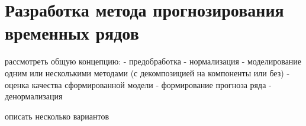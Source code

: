 \linespread{1.11}\selectfont

\chapter{Разработка метода прогнозирования временных рядов}


рассмотреть общую концепцию:
- предобработка
- нормализация
- моделирование одним или несколькими методами (с декомпозицией на компоненты или без)
- оценка качества сформированной модели
- формирование прогноза ряда
- денормализация

описать несколько вариантов